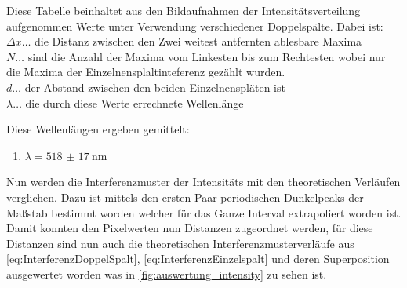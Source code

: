 \documentclass[12pt,english,ngerman]{scrartcl}
\begin{document}
\begin{table}[H]
	\centering
	\caption{Diese Tabelle beinhaltet aus den Bildaufnahmen der Intensitätsverteilung 
  aufgenommen Werte unter Verwendung verschiedener Doppelspälte. Dabei ist: \\
$\Delta x \dots$ die Distanz zwischen den Zwei weitest antfernten ablesbare Maxima \\
$N \dots$ sind die Anzahl der Maxima vom Linkesten bis zum Rechtesten wobei nur 
die Maxima der Einzelnensplaltinteferenz gezählt wurden.\\
$d \dots$ der Abstand zwischen den beiden Einzelnenspläten ist \\
$\lambda \dots$ die durch diese Werte errechnete Wellenlänge 
}\label{tab:auswertungWellenlangenDoppelspalt}
	
\end{table}

Diese Wellenlängen ergeben gemittelt:

\begin{enumerate}
	\item $\lambda = \SI{518(17)}{\nm}$
\end{enumerate}

Nun werden die Interferenzmuster der Intensitäts mit den theoretischen Verläufen
verglichen. Dazu ist mittels den ersten Paar periodischen Dunkelpeaks der
Maßstab bestimmt worden welcher für das Ganze Interval extrapoliert worden ist.
Damit konnten den Pixelwerten nun Distanzen zugeordnet werden, für diese
Distanzen sind nun auch die theoretischen Interferenzmusterverläufe aus
\autoref{eq:InterferenzDoppelSpalt}, \autoref{eq:InterferenzEinzelspalt} und
deren Superposition ausgewertet worden was in
\autoref{fig:auswertung_intensity} zu sehen ist.
\end{document}
